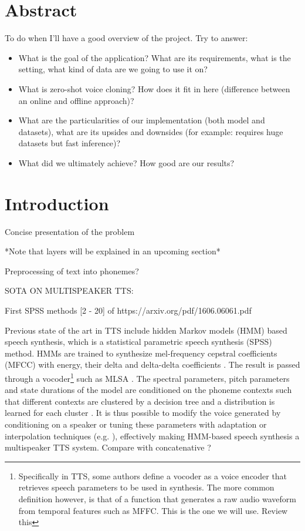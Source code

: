 \documentclass[a4paper, oneside]{article}
\begin{document}
\section{Abstract}
\color{red}
To do when I'll have a good overview of the project. Try to answer:
\begin{itemize}
	\item What is the goal of the application? What are its requirements, what is the setting, what kind of data are we going to use it on?
	\item What is zero-shot voice cloning? How does it fit in here (difference between an online and offline approach)?
	\item What are the particularities of our implementation (both model and datasets), what are its upsides and downsides (for example: requires huge datasets but fast inference)?
	\item What did we ultimately achieve? How good are our results?
\end{itemize}
\color{black}

\section{Introduction}

\color{red}
Concise presentation of the problem

*Note that layers will be explained in an upcoming section*

Preprocessing of text into phonemes?

SOTA ON MULTISPEAKER TTS:

First SPSS methods [2 - 20] of https://arxiv.org/pdf/1606.06061.pdf

\color{black}
Previous state of the art in TTS include hidden Markov models (HMM) based speech synthesis, which is a statistical parametric speech synthesis (SPSS) method. HMMs are trained to synthesize mel-frequency cepstral coefficients (MFCC) with energy, their delta and delta-delta coefficients \cite{TTSSOTA}. The result is passed through a vocoder\footnote{Specifically in TTS, some authors define a vocoder as a voice encoder that retrieves speech parameters to be used in synthesis. The more common definition however, is that of a function that generates a raw audio waveform from temporal features such as MFFC. This is the one we will use. \color{red} Review this \color{black}} such as MLSA \cite{MLSA}. The spectral parameters, pitch parameters and state durations of the model are conditioned on the phoneme contexts such that different contexts are clustered by a decision tree and a distribution is learned for each cluster \cite{HMMTTS}. It is thus possible to modify the voice generated by conditioning on a speaker or tuning these parameters with adaptation or interpolation techniques (e.g. \cite{HMMSpeakerInterpolation}), effectively making HMM-based speech synthesis a multispeaker TTS system. \color{red} Compare with concatenative \cite{SPSSDNN} ? \color{black}
\end{document}
